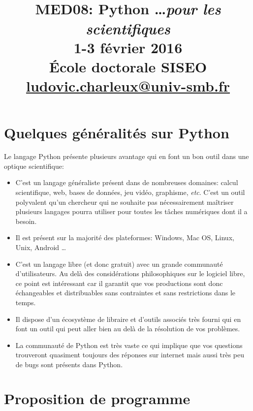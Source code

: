 \documentclass[a4paper,10pt,twoside]{article}
\title{\HRule\\
MED08: Python \ldots \textit{pour les scientifiques} \\
1-3 février 2016 \\
École doctorale SISEO \\
\href{mailto:ludovic.charleux@univ-smb.fr}{ludovic.charleux@univ-smb.fr}
\HRule
}
\date{}
\begin{document}
\maketitle

\section{Quelques généralités sur Python}


Le langage Python présente plusieurs avantage qui en font un bon outil dans une optique scientifique:
\begin{itemize}
\item C'est un langage généraliste présent dans de nombreuses domaines: calcul scientifique, web, bases de données, jeu vidéo, graphisme, \textit{etc}. C'est un outil polyvalent qu'un chercheur qui ne souhaite pas nécessairement maîtriser plusieurs langages  pourra utiliser pour toutes les tâches numériques dont il a besoin. 
\item Il est présent sur la majorité des plateformes: Windows, Mac OS, Linux, Unix, Android \ldots
\item C'est un langage libre (et donc gratuit) avec un grande communauté d'utilisateurs. Au delà des considérations philosophiques sur le logiciel libre,  ce point est intéressant car il garantit que vos productions sont donc échangeables et distribuables sans contraintes et sans restrictions dans le temps.
\item Il dispose d'un écosystème de libraire et d'outils associés très fourni qui en font un outil qui peut aller bien au delà de la résolution de vos problèmes.
\item La communauté de Python est très vaste ce qui implique que vos questions trouveront quasiment toujours des réponses sur internet mais aussi très peu de bugs sont présents dans Python.

\end{itemize}

\section{Proposition de programme}
\end{document}
